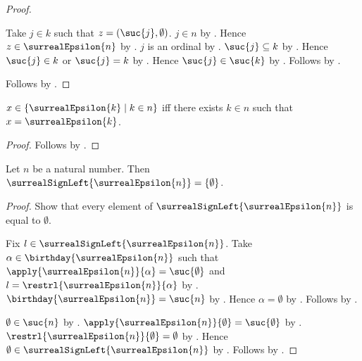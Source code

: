 \begin{proof}
\begin{subproof}
\begin{byCase}
                Take $j\in k$ such that $z=(\suc{j},\emptyset)$.
                $j\in n$ by .
                Hence $z\in\surrealEpsilon{n}$
                    by .
                $j$ is an ordinal by .
                $\suc{j}\subseteq k$ by .
                Hence $\suc{j}\in k$ or $\suc{j}=k$
                    by .
                Hence $\suc{j}\in\suc{k}$ by .
                Follows by .
        \end{byCase}
    \end{subproof}
    Follows by .
\end{proof}

\begin{proposition}\label{surreal_epsilon_image_iff}
    $x\in\{\surrealEpsilon{k}\mid k\in n\}$ iff
        there exists $k\in n$ such that $x=\surrealEpsilon{k}$.
\end{proposition}
\begin{proof}
    Follows by .
\end{proof}

\begin{proposition}\label{surreal_epsilon_sign_left}
    Let $n$ be a natural number.
    Then $\surrealSignLeft{\surrealEpsilon{n}}=\{\emptyset\}$.
\end{proposition}
\begin{proof}
    Show that every element of $\surrealSignLeft{\surrealEpsilon{n}}$
        is equal to $\emptyset$.
    \begin{subproof}
        Fix $l\in\surrealSignLeft{\surrealEpsilon{n}}$.
        Take $\alpha\in\birthday{\surrealEpsilon{n}}$ such that
            $\apply{\surrealEpsilon{n}}{\alpha}=\suc{\emptyset}$ and
            $l=\restrl{\surrealEpsilon{n}}{\alpha}$
            by .
        $\birthday{\surrealEpsilon{n}}=\suc{n}$
            by .
        Hence $\alpha=\emptyset$
            by .
        Follows by .
    \end{subproof}
    $\emptyset\in\suc{n}$
        by .
    $\apply{\surrealEpsilon{n}}{\emptyset}=\suc{\emptyset}$
        by .
    $\restrl{\surrealEpsilon{n}}{\emptyset}=\emptyset$
        by .
    Hence $\emptyset\in\surrealSignLeft{\surrealEpsilon{n}}$
        by .
    Follows by .
\end{proof}

